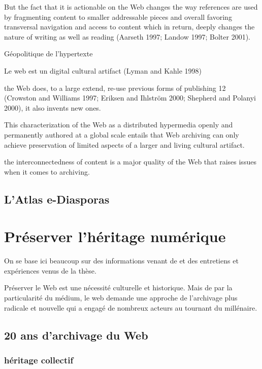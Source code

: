 \documentclass[symmetric,justified,marginals=raggedouter]{tufte-book}
\begin{document}
But the fact that it is actionable on the Web changes the way references are used by fragmenting content to smaller addressable pieces and overall favoring transversal navigation and access to content which in return, deeply changes the nature of writing as well as reading (Aarseth 1997; Landow 1997; Bolter 2001).

Géopolitique de l'hypertexte

Le web est un digital cultural artifact (Lyman and Kahle 1998)

 the Web does, to a large extend, re-use previous forms of publishing 12 (Crowston and Williams 1997; Eriksen and Ihlström 2000; Shepherd and Polanyi 2000), it also invents new ones.
 
This characterization of the Web as a distributed hypermedia openly and permanently authored at a global scale entails that Web archiving can only achieve preservation of limited aspects of a larger and living cultural artifact.

the interconnectedness of content is a major quality of the Web that raises issues when it comes to archiving.

\section{L'Atlas e-Diasporas}
\label{sec:2_atlas}


\chapter{Préserver l'héritage numérique}

On se base ici beaucoup sur des informations venant de \citep{masanes_web_2006} et des entretiens et expériences venus de la thèse. 

Préserver le Web est une nécessité culturelle et historique. Mais de par la particularité du médium, le web demande une approche de l'archivage plus radicale et nouvelle qui a engagé de nombreux acteurs au tournant du millénaire. 


\section{20 ans d'archivage du Web}

\subsection{héritage collectif}
\end{document}
